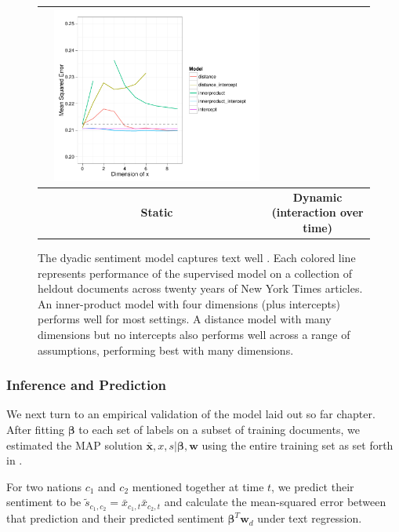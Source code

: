 \begin{figure}
\begin{tabular}{|c|c|c|}
  & \includegraphics[height=0.27\textheight]{chapter_foreign_relations/figures/010_dynamic_model_results.pdf}
  \\
\hline
 & \textbf{Static} & \textbf{Dynamic (interaction over time)} \\
\hline
\end{tabular}
  \label{fig:fr_supervised_performance}
   \caption{The dyadic sentiment model captures text well . Each
     colored line represents performance of the supervised model on a collection
     of heldout documents across twenty years of New York Times
     articles. An inner-product model with four dimensions (plus
     intercepts) performs well for most settings.  A distance model
     with many dimensions but no intercepts also performs well across
     a range of assumptions, performing best with many dimensions.}
\end{figure}

\subsubsection{Inference and Prediction}
We next turn to an empirical validation of the model laid out so far
chapter. After fitting $\bm \beta$ to each set of labels on a subset
of training documents, we estimated the MAP solution $\bm \bar x, x, s
| \bm \beta, \bm w$ using the entire training set as set forth in
.

For two nations $c_1$ and $c_2$ mentioned together at time $t$, we
predict their sentiment to be $\tilde s_{c_1, c_2} = \bar x_{c_1,t}
\bar x_{c_2, t}$ and calculate the mean-squared error between that
prediction and their predicted sentiment $\bm \beta^T \bm w_d$ under
text regression.

